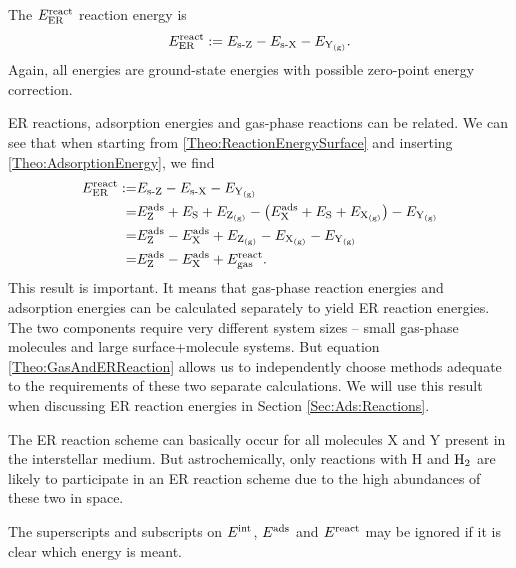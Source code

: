 The $E^{\text{react}}_{\text{ER}}$ reaction energy is
\begin{equation}
 E^{\text{react}}_{\text{ER}}:= E_{\text{s-}\text Z} - E_{\text{s-}\text X} - E_{\text Y_\text{(g)}}.
 \label{Theo:ReactionEnergySurface}
\end{equation}
Again, all energies are ground-state energies with possible zero-point energy
correction.

ER reactions, adsorption energies and gas-phase reactions can be related. We can see
that when starting from \eqref{Theo:ReactionEnergySurface} and inserting
\eqref{Theo:AdsorptionEnergy}, we find
\begin{equation}
 \begin{aligned}
   E^{\text{react}}_{\text{ER}}:=& E_{\text{s-}\text Z} - E_{\text{s-}\text X} - E_{\text Y_\text{(g)}}\\
   =& E^{\text{ads}}_{\text Z}+E_{\text S} + E_{\text Z_\text{(g)}} - \left({E^{\text{ads}}_{\text X} +E_{\text S} + E_{\text X_\text{(g)}}}\right) - E_{\text Y_\text{(g)}}\\
   =& E^{\text{ads}}_{\text Z}-E^{\text{ads}}_{\text X} + E_{\text Z_\text{(g)}} - E_{\text X_\text{(g)}} - E_{\text Y_\text{(g)}}\\
   =& E^{\text{ads}}_{\text Z}-E^{\text{ads}}_{\text X} + E^{\text{react}}_{\text{gas}}.
 \end{aligned}
 \label{Theo:GasAndERReaction}
\end{equation}
This result is important. It means that gas-phase reaction energies and
adsorption energies can be calculated separately to yield ER reaction energies.
The two components require very different system sizes -- small gas-phase
molecules and large surface+molecule systems. But equation
\eqref{Theo:GasAndERReaction} allows us to independently choose methods
adequate to the requirements of these two separate calculations.
We will use this result when discussing ER reaction energies in Section
\ref{Sec:Ads:Reactions}.

The ER reaction scheme can basically occur for all molecules X and Y present in
the interstellar medium. But astrochemically, only reactions with H and $\text H_2$
are likely to participate in an ER reaction scheme due to the high
abundances of these two in space.

The superscripts and subscripts on $E^{\text{int}}$, $E^{\text{ads}}$ and $E^{\text{react}}$ may be ignored
if it is clear which energy is meant.

